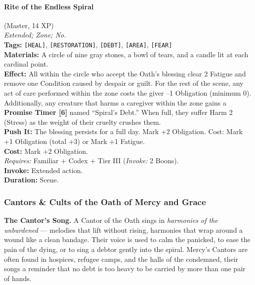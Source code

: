 \paragraph{Rite of the Endless Spiral} (Master, 14 XP) \hfill \\
\emph{Extended; Zone; No.} \\
\textbf{Tags:} \texttt{[HEAL]}, \texttt{[RESTORATION]}, \texttt{[DEBT]}, \texttt{[AREA]}, \texttt{[FEAR]} \\
\textbf{Materials:} A circle of nine gray stones, a bowl of tears, and a candle lit at each cardinal point. \\
\textbf{Effect:} All within the circle who accept the Oath's blessing clear 2 Fatigue and remove one Condition caused by despair or guilt. For the rest of the scene, any act of care performed within the zone costs the giver --1 Obligation (minimum 0). Additionally, any creature that harms a caregiver within the zone gains a \textbf{Promise Timer [6]} named ``Spiral's Debt.'' When full, they suffer Harm 2 (Stress) as the weight of their cruelty crushes them. \\
\textbf{Push It:} The blessing persists for a full day. Mark +2 Obligation. Cost: Mark +1 Obligation (total +3) or Mark +1 Fatigue. \\
\textbf{Cost:} Mark +2 Obligation. \\
\textit{Requires:} Familiar + Codex + Tier III (\textit{Invoke:} 2 Boons). \\
\textbf{Invoke:} Extended action. \\
\textbf{Duration:} Scene.

\subsubsection*{Cantors \& Cults of the Oath of Mercy and Grace}

\textbf{The Cantor's Song.} A Cantor of the Oath sings in \textit{harmonies of the unburdened} --- melodies that lift without rising, harmonies that wrap around a wound like a clean bandage. Their voice is used to calm the panicked, to ease the pain of the dying, or to sing a debtor gently into the spiral. Mercy's Cantors are often found in hospices, refugee camps, and the halls of the condemned, their songs a reminder that no debt is too heavy to be carried by more than one pair of hands.

